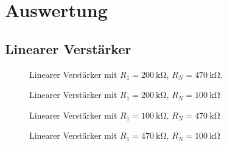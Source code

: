 \section{Auswertung}%
\label{sec:auswertung}
\subsection{Linearer Verst\"arker}

\begin{figure}[ht]
  \centering
  
  \caption{Linearer Verst\"arker mit $R_1 = \SI{200}{\kilo\ohm}$, $R_N = \SI{470}{\kilo\ohm}$.}
  \label{fig:}
\end{figure}

\begin{figure}[ht]
  \centering
  
  \caption{Linearer Verst\"arker mit $R_1 = \SI{200}{\kilo\ohm}$, $R_N = \SI{100}{\kilo\ohm}$}
  \label{fig:}
\end{figure}

\begin{figure}[ht]
  \centering
  
  \caption{Linearer Verst\"arker mit $R_1 = \SI{100}{\kilo\ohm}$, $R_N = \SI{470}{\kilo\ohm}$}
  \label{fig:}
\end{figure}

\begin{figure}[ht]
  \centering
  
  \caption{Linearer Verst\"arker mit $R_1 = \SI{470}{\kilo\ohm}$, $R_N = \SI{100}{\kilo\ohm}$}
  \label{fig:}
\end{figure}

